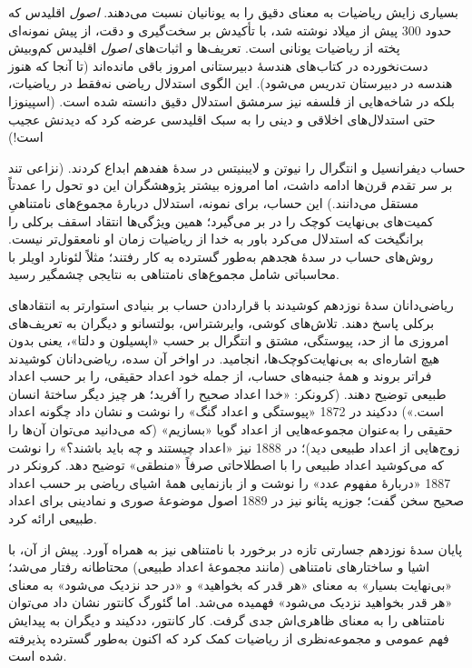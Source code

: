 \documentclass[../../../include/open-logic-section]{subfiles}
\begin{document}
بسیاری زایش ریاضیات به معنای دقیق را به یونانیان نسبت می‌دهند.
\emph{اصول} اقلیدس که حدود 300 پیش از میلاد نوشته شد، با تأکیدش بر
سخت‌گیری و دقت، از پیش نمونه‌ای پخته از ریاضیات یونانی است. تعریف‌ها
و اثبات‌های \emph{اصول} اقلیدس کم‌وبیش دست‌نخورده در کتاب‌های هندسهٔ
دبیرستانی امروز باقی مانده‌اند (تا آنجا که هنوز هندسه در دبیرستان
تدریس می‌شود). این الگوی استدلال ریاضی نه‌فقط در ریاضیات، بلکه در
شاخه‌هایی از فلسفه نیز سرمشق استدلال دقیق دانسته شده است. (اسپینوزا
حتی استدلال‌های اخلاقی و دینی را به سبک اقلیدسی عرضه کرد که دیدنش
عجیب است!)

حساب دیفرانسیل و انتگرال را نیوتن و لایبنیتس در سدهٔ هفدهم ابداع
کردند. (نزاعی تند بر سر تقدم قرن‌ها ادامه داشت، اما امروزه بیشتر
پژوهشگران این دو تحول را عمدتاً مستقل می‌دانند.) این حساب، برای
نمونه، استدلال دربارهٔ مجموع‌های نامتناهیِ کمیت‌های بی‌نهایت کوچک را
در بر می‌گیرد؛ همین ویژگی‌ها انتقاد اسقف برکلی را برانگیخت که استدلال
می‌کرد باور به خدا از ریاضیات زمان او نامعقول‌تر نیست. روش‌های حساب
در سدهٔ هجدهم به‌طور گسترده به کار رفتند؛ مثلاً لئونارد اویلر با
محاسباتی شامل مجموع‌های نامتناهی به نتایجی چشمگیر رسید.

ریاضی‌دانان سدهٔ نوزدهم کوشیدند با قراردادن حساب بر بنیادی استوارتر
به انتقادهای برکلی پاسخ دهند. تلاش‌های کوشی، وایرشتراس، بولتسانو و
دیگران به تعریف‌های امروزی ما از حد، پیوستگی، مشتق و انتگرال بر حسب
«اپسیلون و دلتا»، یعنی بدون هیچ اشاره‌ای به بی‌نهایت‌کوچک‌ها،
انجامید. در اواخر آن سده، ریاضی‌دانان کوشیدند فراتر بروند و همهٔ
جنبه‌های حساب، از جمله خود اعداد حقیقی، را بر حسب اعداد طبیعی توضیح
دهند. (کرونکر: «خدا اعداد صحیح را آفرید؛ هر چیز دیگر ساختهٔ انسان
است.») ددکیند در 1872 «پیوستگی و اعداد گنگ» را نوشت و نشان داد چگونه
اعداد حقیقی را به‌عنوان مجموعه‌هایی از اعداد گویا «بسازیم» (که
می‌دانید می‌توان آن‌ها را زوج‌هایی از اعداد طبیعی دید)؛ در 1888 نیز
«اعداد چیستند و چه باید باشند؟» را نوشت که می‌کوشید اعداد طبیعی را
با اصطلاحاتی صرفاً «منطقی» توضیح دهد. کرونکر در 1887 «دربارهٔ مفهوم
عدد» را نوشت و از بازنمایی همهٔ اشیای ریاضی بر حسب اعداد صحیح سخن
گفت؛ جوزپه پئانو نیز در 1889 اصول موضوعهٔ صوری و نمادینی برای اعداد
طبیعی ارائه کرد.

پایان سدهٔ نوزدهم جسارتی تازه در برخورد با نامتناهی نیز به همراه
آورد. پیش از آن، با اشیا و ساختارهای نامتناهی (مانند مجموعهٔ اعداد
طبیعی) محتاطانه رفتار می‌شد؛ «بی‌نهایت بسیار» به معنای «هر قدر که
بخواهید» و «در حد نزدیک می‌شود» به معنای «هر قدر بخواهید نزدیک
می‌شود» فهمیده می‌شد. اما گئورگ کانتور نشان داد می‌توان نامتناهی را
به معنای ظاهری‌اش جدی گرفت. کار کانتور، ددکیند و دیگران به پیدایش
فهم عمومی و مجموعه‌نظری از ریاضیات کمک کرد که اکنون به‌طور گسترده
پذیرفته شده است.
\end{document}
